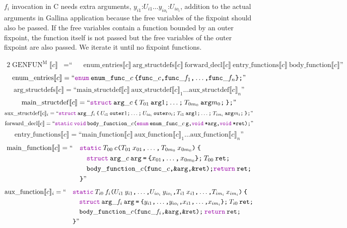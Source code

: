 \documentclass[a4paper,fleqn]{article}
\def\gallina{\textrm{Gallina}}
\newcommand{\BRA}[1]{\llbracket #1 \rrbracket}
\DeclareMathOperator{\genfunop}{GENFUN}
\newcommand{\genfunm}[1]{\genfunop^\mathrm{M}\BRA{#1}}
\newcommand{\enumentries}[1]{\mathrm{enum\_entries}\BRA{#1}}
\newcommand{\argstructdefs}[1]{\mathrm{arg\_structdefs}\BRA{#1}}
\newcommand{\mainstructdef}[1]{\mathrm{main\_structdef}\BRA{#1}}
\newcommand{\auxstructdef}[2]{\mathrm{aux\_structdef}\BRA{#1}_{#2}}
\newcommand{\forwarddecl}[1]{\mathrm{forward\_decl}\BRA{#1}}
\newcommand{\entryfunctions}[1]{\mathrm{entry\_functions}\BRA{#1}}
\newcommand{\mainfunction}[1]{\mathrm{main\_function}\BRA{#1}}
\newcommand{\auxfunction}[2]{\mathrm{aux\_function}\BRA{#1}_{#2}}
\newcommand{\bodyfunction}[1]{\mathrm{body\_function}\BRA{#1}}
\newcommand{\ldq}{\text{``}}
\newcommand{\rdq}{\text{''}}
\newcommand{\dq}[1]{\text{``}#1\text{''}}
\newcommand{\ttparen}[1]{\texttt{(}#1\texttt{)}}
\newcommand{\ttlbrace}{\texttt{\char '173}}
\newcommand{\ttrbrace}{\texttt{\char '175}}
\newcommand{\ttbrace}[1]{\ttlbrace#1\ttrbrace}
\newcommand{\tteq}{\texttt{=}}
\newcommand{\ttsemi}{\texttt{;}}
\newcommand{\ttcomma}{\texttt{,}}
\newcommand{\ttstar}{\texttt{*}}
\newcommand{\ttamp}{\texttt{\&}}
\newcommand{\kwstruct}{\mbox{\color{myviolet}\ttfamily struct}}
\newcommand{\kwvoid}{\mbox{\color{myviolet}\ttfamily void}}
\newcommand{\kwCreturn}{\mbox{\color{myviolet}\ttfamily return}}
\newcommand{\kwenum}{\mbox{\color{myviolet}\ttfamily enum}}
\newcommand{\kwstatic}{\mbox{\color{myviolet}\ttfamily static}}
\begin{document}
$f_i$ invocation in C needs extra arguments, $y_{i1}\mathord{:}U_{i1} \ldots y_{io_i}\mathord{:}U_{io_i}$, addition to the actual arguments in \gallina{} application because the free variables of the fixpoint should also be passed.
If the free variables contain a function bounded by an outer fixpoint, the function itself is not passed but the free variables of the outer fixpoint are also passed.
We iterate it until no fixpoint functions.

\begin{alignat*}{2}
  \genfunm{c} &= \ldq && \enumentries{c}~\argstructdefs{c}~\forwarddecl{c}~\entryfunctions{c}~\bodyfunction{c} \rdq
\end{alignat*}
\[ \enumentries{c} = \dq{\kwenum\:\mathtt{enum\_func\_}c\:\ttbrace{ \mathtt{func\_}c\ttcomma \mathtt{func\_}f_1\ttcomma \dotsc\ttcomma \mathtt{func\_}f_n }\ttsemi} \]
\[ \argstructdefs{c} = \dq{\mainstructdef{c}\:\auxstructdef{c}{1} \ldots \auxstructdef{c}{n}} \]
\[ \mainstructdef{c} = \dq{\kwstruct\:\mathtt{arg\_}c\:\ttbrace{\:T_{01}\:\mathtt{arg}1\ttsemi \ldots\ttsemi\: T_{0m_0}\:\mathtt{arg}m_0\ttsemi\:}\ttsemi} \]
\[ \auxstructdef{c}{i} = \dq{\kwstruct\:\mathtt{arg\_}f_i\:\ttbrace{\:U_{i1}\:\mathtt{outer}1\ttsemi \ldots\ttsemi\: U_{io_i}\:\mathtt{outer}o_i\ttsemi\:T_{i1}\:\mathtt{arg}1\ttsemi \ldots\ttsemi\: T_{im_i}\:\mathtt{arg}m_i\ttsemi\:}\ttsemi} \]
\[ \forwarddecl{c} = \dq{\kwstatic\:\kwvoid\:\mathtt{body\_function\_}c\ttparen{\kwenum\:\mathtt{enum\_func\_}c\:\mathtt{g}\ttcomma \kwvoid\:\mathtt{\ttstar arg}\ttcomma \kwvoid\:\mathtt{\ttstar ret}}\ttsemi} \]
\[ \entryfunctions{c} = \dq{\mainfunction{c}\:\auxfunction{c}{1} \ldots \auxfunction{c}{n}} \]
\begin{alignat*}{2}
  \mainfunction{c} &= \ldq && \kwstatic\:T_{00}\:c\ttparen{T_{01}\:x_{01}\ttcomma\dotsc\ttcomma\, T_{0m_0}\:x_{0m_0}}\:\ttlbrace \\
  & && \quad \kwstruct\:\mathtt{arg\_}c\:\mathtt{arg}\:\tteq\:\ttbrace{ x_{01}\ttcomma\dotsc\ttcomma\, x_{0m_0} }\ttsemi\:T_{00}\:\mathtt{ret}\ttsemi \\
  & && \quad \mathtt{body\_function\_}c\ttparen{\mathtt{func\_}c\ttcomma \ttamp\mathtt{arg}\ttcomma \ttamp\mathtt{ret}}\ttsemi \kwCreturn\:\mathtt{ret}\ttsemi \\
  & && \ttrbrace \rdq
\end{alignat*}
\begin{alignat*}{2}
  \auxfunction{c}{i} &= \ldq && \kwstatic\:T_{i0}\:f_i\ttparen{U_{i1}\:y_{i1}\ttcomma\dotsc\ttcomma U_{io_i}\:y_{io_i}\ttcomma T_{i1}\:x_{i1}\ttcomma\dotsc\ttcomma T_{im_i}\:x_{im_i}}\:\ttlbrace \\
  & && \quad \kwstruct\:\mathtt{arg\_}f_i\:\mathtt{arg}\:\tteq\:\ttbrace{ y_{i1}\ttcomma\dotsc\ttcomma y_{io_i}\ttcomma x_{i1}\ttcomma\dotsc\ttcomma x_{im_i} }\ttsemi\:T_{i0}\:\mathtt{ret}\ttsemi\\
  & && \quad \mathtt{body\_function\_}c\ttparen{\mathtt{func\_}f_i\ttcomma \ttamp\mathtt{arg}\ttcomma \ttamp\mathtt{ret}}\ttsemi\:\kwCreturn\:\mathtt{ret}\ttsemi \\
  & && \ttrbrace \rdq
\end{alignat*}
\end{document}
